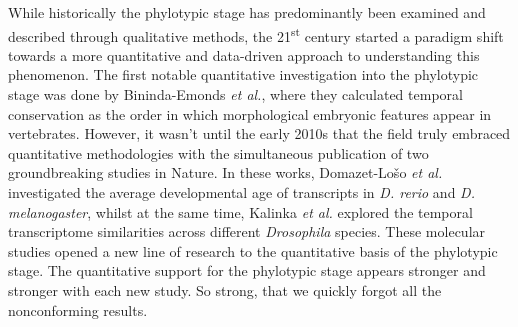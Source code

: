 While historically the phylotypic stage has predominantly been examined and described through qualitative methods, the 21\textsuperscript{st} century started a paradigm shift towards a more quantitative and data-driven approach to understanding this phenomenon\cite{Chan2021}. The first notable quantitative investigation into the phylotypic stage was done by Bininda-Emonds \textit{et al.}, where they calculated temporal conservation as the order in which morphological embryonic features appear in vertebrates\cite{OlafRP2003}. However, it wasn't until the early 2010s that the field truly embraced quantitative methodologies with the simultaneous publication of two groundbreaking studies in Nature\cite{Kalinka2010, DomazetLoso2010}. In these works, Domazet-Lošo \textit{et al.} investigated the average developmental age of transcripts in \textit{D. rerio} and \textit{D. melanogaster}, whilst at the same time, Kalinka \textit{et al.} explored the temporal transcriptome similarities across different \textit{Drosophila} species. These molecular studies opened a new line of research to the quantitative basis of the phylotypic stage. The quantitative support for the phylotypic stage appears stronger and stronger with each new study. So strong, that we quickly forgot all the nonconforming results.

